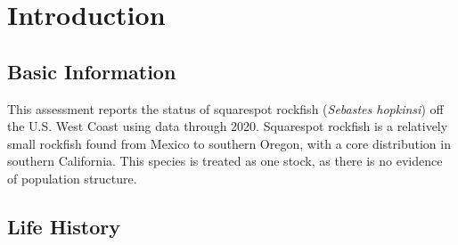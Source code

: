 \documentclass[11pt,
  english,
  a4paper,
]{article}
\begin{document}
\newcommand{\lt}{\ensuremath <}
\newcommand{\gt}{\ensuremath >}

\vspace{500cm}

\pagebreak
{}
\setcounter{page}{1}

\renewcommand{\thetable}{\roman{table}}
\renewcommand{\thefigure}{\roman{figure}}

\setlength\parskip{0.5em plus 0.1em minus 0.2em}

\pagebreak
\setlength{\parskip}{5mm plus1mm minus1mm}
\setcounter{page}{1}
\renewcommand{\thefigure}{\arabic{figure}}
\renewcommand{\thetable}{\arabic{table}}
\setcounter{table}{0}
\setcounter{figure}{0}

\setlength\parskip{0.5em plus 0.1em minus 0.2em}


\hypertarget{introduction}{%
\section{Introduction}\label{introduction}}

\leavevmode\tagmcend\tagstructend


\hypertarget{basic-information}{%
\subsection{Basic Information}\label{basic-information}}

\leavevmode\tagmcend\tagstructend


This assessment reports the status of squarespot rockfish (\emph{Sebastes hopkinsi}) off the U.S. West Coast using data through 2020. Squarespot rockfish is a relatively small rockfish found from Mexico to southern Oregon, with a core distribution in southern California. This species is treated as one stock, as there is no evidence of population structure.

\leavevmode\tagmcend\tagstructend\par


\hypertarget{life-history}{%
\subsection{Life History}\label{life-history}}
\end{document}
